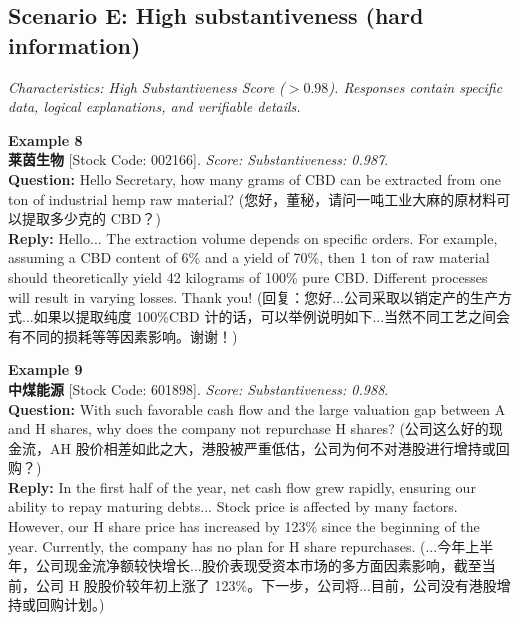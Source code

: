 \documentclass[12pt]{article}
\begin{document}
\subsection{Scenario E: High substantiveness (hard information)}
\textit{Characteristics: High Substantiveness Score ($> 0.98$). Responses contain specific data, logical explanations, and verifiable details.}
\vspace{0.3cm}

\noindent \textbf{Example 8} \\
\textbf{莱茵生物} [Stock Code: 002166]. \textit{Score: Substantiveness: 0.987}. \\
\textbf{Question:} Hello Secretary, how many grams of CBD can be extracted from one ton of industrial hemp raw material? (您好，董秘，请问一吨工业大麻的原材料可以提取多少克的 CBD？) \\
\textbf{Reply:} Hello... The extraction volume depends on specific orders. For example, assuming a CBD content of 6\% and a yield of 70\%, then 1 ton of raw material should theoretically yield 42 kilograms of 100\% pure CBD. Different processes will result in varying losses. Thank you! (回复：您好...公司采取以销定产的生产方式...如果以提取纯度 100\%CBD 计的话，可以举例说明如下...当然不同工艺之间会有不同的损耗等等因素影响。谢谢！)
\vspace{0.4cm}

\noindent \textbf{Example 9} \\
\textbf{中煤能源} [Stock Code: 601898]. \textit{Score: Substantiveness: 0.988}. \\
\textbf{Question:} With such favorable cash flow and the large valuation gap between A and H shares, why does the company not repurchase H shares? (公司这么好的现金流，AH 股价相差如此之大，港股被严重低估，公司为何不对港股进行增持或回购？) \\
\textbf{Reply:} In the first half of the year, net cash flow grew rapidly, ensuring our ability to repay maturing debts... Stock price is affected by many factors. However, our H share price has increased by 123\% since the beginning of the year. Currently, the company has no plan for H share repurchases. (...今年上半年，公司现金流净额较快增长...股价表现受资本市场的多方面因素影响，截至当前，公司 H 股股价较年初上涨了 123\%。下一步，公司将...目前，公司没有港股增持或回购计划。)

\clearpage
\newpage

 
\end{document}
